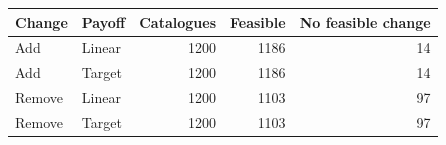 \begin{tabular}{llrrr}
\toprule
Change & Payoff & Catalogues & Feasible & No feasible change \\
\midrule
Add & Linear & 1200 & 1186 & 14 \\
Add & Target & 1200 & 1186 & 14 \\
Remove & Linear & 1200 & 1103 & 97 \\
Remove & Target & 1200 & 1103 & 97 \\
\bottomrule
\end{tabular}

